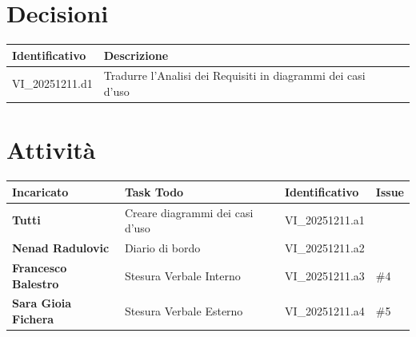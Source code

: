 \documentclass[a4paper,12pt]{article}
\begin{document}
    \section{Decisioni} {
        \begin{tabularx}{\textwidth}{|l|X|l|}
            \hline
            \textbf{Identificativo} & \textbf{Descrizione}\\
            \hline
            VI\_20251211.d1 & Tradurre l'Analisi dei Requisiti in diagrammi dei casi d'uso\\
            \hline
        \end{tabularx}
    }

    \section{Attività} {
        \begin{tabularx}{\textwidth}{|l|X|l|l|}
            \hline
            \textbf{Incaricato} & \textbf{Task Todo} & \textbf{Identificativo} & \textbf{Issue} \\
            \hline
            \textbf{Tutti} & Creare diagrammi dei casi d'uso & VI\_20251211.a1 & \\
            \hline
            \textbf{Nenad Radulovic} & Diario di bordo & VI\_20251211.a2 & \\
            \hline
            \textbf{Francesco Balestro} & Stesura Verbale Interno & VI\_20251211.a3 & \#4\\
            \hline
            \textbf{Sara Gioia Fichera} & Stesura Verbale Esterno & VI\_20251211.a4 & \#5\\
            \hline
        \end{tabularx}
    }
\end{document}
